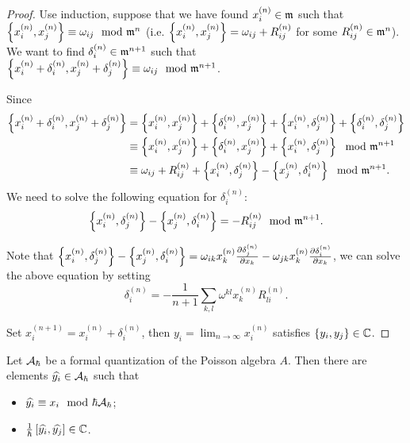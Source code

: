 \begin{proof}
  Use induction, suppose that we have found $x_{i}^{\bra{n}} \in \fm$ such that $\Bra{x_{i}^{\bra{n}}, x_{j}^{\bra{n}}} \equiv \omega_{ij} \mod \fm^n$ (i.e. $\Bra{x_i^{(n)}, x_j^{(n)}} = \omega_{ij} + R_{ij}^{(n)} $ for some $R_{ij}^{(n)} \in \fm^n$). We want to find $\delta_i^{\bra{n}} \in \fm^{n+1}$ such that $\Bra{x_i^{\bra{n}} + \delta_i^{\bra{n}}, x_j^{\bra{n}} + \delta_j^{\bra{n}}} \equiv \omega_{ij} \mod \fm^{n+1}$.

  Since
  \begin{align*}
    \Bra{x_i^{(n)} + \delta_i^{(n)}, x_j^{(n)} + \delta_j^{(n)}} &= \Bra{x_i^{(n)}, x_j^{(n)}} + \Bra{\delta_i^{(n)}, x_j^{(n)}} + \Bra{x_i^{(n)}, \delta_j^{(n)}} + \Bra{\delta_i^{(n)}, \delta_j^{(n)}} \\
    &\equiv \Bra{x_i^{(n)}, x_j^{(n)}} + \Bra{\delta_i^{(n)}, x_j^{(n)}} + \Bra{x_i^{(n)}, \delta_j^{(n)}} \mod \fm^{n+1}\\
    &\equiv \omega_{ij} + R_{ij}^{(n)} + \Bra{x_i^{(n)}, \delta_j^{(n)}} - \Bra{ x_j^{(n)}, \delta_i^{(n)}} \mod \fm^{n+1}.
  \end{align*}
  We need to solve the following equation for $\delta_i^{(n)}$:
  \[\Bra{x_i^{(n)}, \delta_j^{(n)}} - \Bra{ x_j^{(n)}, \delta_i^{(n)}} = -R_{ij}^{(n)} \mod \fm^{n+1}.\]

  Note that $\Bra{x_i^{(n)}, \delta_j^{(n)}} - \Bra{ x_j^{(n)}, \delta_i^{(n)}} = \omega_{ik}x_k^{(n)}\frac{\partial \delta_j^{(n)}}{\partial x_k} - \omega_{jk}x_k^{(n)}\frac{\partial \delta_i^{(n)}}{\partial x_k}$, we can solve the above equation by setting
  \[\delta_i^{(n)} = -\frac{1}{n+1} \sum_{k,l} \omega^{kl} x_k^{(n)} R_{li}^{(n)}.\]

  Set $x_i^{(n+1)} = x_i^{(n)} + \delta_i^{(n)}$, then $y_i = \lim_{n \to \infty} x_i^{(n)}$ satisfies $\{y_i, y_j\} \in \BC$.
\end{proof}


\begin{thm}
  Let $\CA_{\hbar}$ be a formal quantization of the Poisson algebra $A$. Then there are elements $\widehat{y_i} \in \CA_{\hbar}$ such that
  \begin{itemize}
    \item $\widehat{y_i} \equiv x_i \mod \hbar \CA_{\hbar}$;
    \item $\frac{1}{\hbar}\left[\widehat{y_i}, \widehat{y_j}\right] \in \BC$.
  \end{itemize}
\end{thm}

